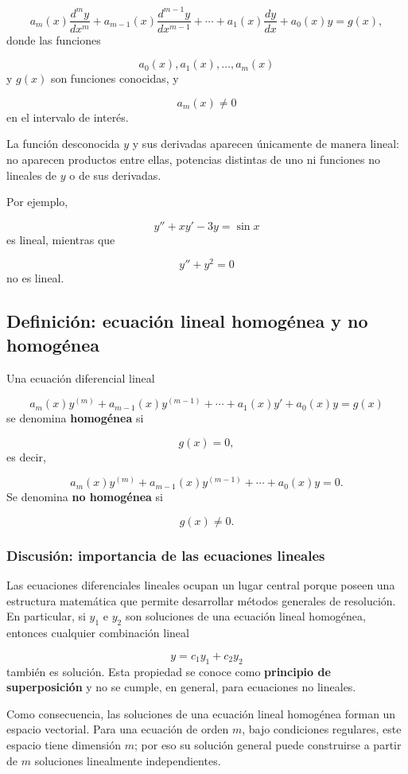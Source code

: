 \documentclass[12pt,a4paper]{article}
\begin{document}
	\[
	a_m(x)\frac{d^m y}{dx^m}
	+
	a_{m-1}(x)\frac{d^{m-1}y}{dx^{m-1}}
	+
	\cdots
	+
	a_1(x)\frac{dy}{dx}
	+
	a_0(x)y
	=
	g(x),
	\]
	donde las funciones
	
	\[
	a_0(x),a_1(x),\dots,a_m(x)
	\]
	y \(g(x)\) son funciones conocidas, y
	
	\[
	a_m(x)\neq 0
	\]
	en el intervalo de interés.
	
	La función desconocida \(y\) y sus derivadas aparecen únicamente de manera lineal: no aparecen productos entre ellas, potencias distintas de uno ni funciones no lineales de \(y\) o de sus derivadas.
	
	Por ejemplo,
	
	\[
	y''+x y'-3y=\sin x
	\]
	es lineal, mientras que
	
	\[
	y''+y^2=0
	\]
	no es lineal.
	
	\subsection{Definición: ecuación lineal homogénea y no homogénea}
	
	Una ecuación diferencial lineal
	
	\[
	a_m(x)y^{(m)}
	+
	a_{m-1}(x)y^{(m-1)}
	+
	\cdots
	+
	a_1(x)y'
	+
	a_0(x)y
	=
	g(x)
	\]
	se denomina \textbf{homogénea} si
	
	\[
	g(x)=0,
	\]
	es decir,
	
	\[
	a_m(x)y^{(m)}
	+
	a_{m-1}(x)y^{(m-1)}
	+
	\cdots
	+
	a_0(x)y
	=
	0.
	\]
	Se denomina \textbf{no homogénea} si
	
	\[
	g(x)\neq 0.
	\]
	\subsubsection*{Discusión: importancia de las ecuaciones lineales}
	
	Las ecuaciones diferenciales lineales ocupan un lugar central porque poseen una estructura matemática que permite desarrollar métodos generales de resolución. En particular, si \(y_1\) e \(y_2\) son soluciones de una ecuación lineal homogénea, entonces cualquier combinación lineal
	
	\[
	y=c_1y_1+c_2y_2
	\]
	también es solución. Esta propiedad se conoce como \textbf{principio de superposición} y no se cumple, en general, para ecuaciones no lineales.
	
	Como consecuencia, las soluciones de una ecuación lineal homogénea forman un espacio vectorial. Para una ecuación de orden \(m\), bajo condiciones regulares, este espacio tiene dimensión \(m\); por eso su solución general puede construirse a partir de \(m\) soluciones linealmente independientes.
	
\end{document}
